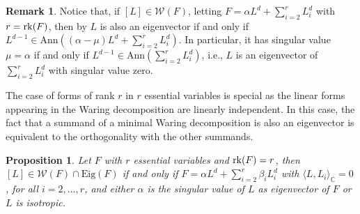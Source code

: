 \documentclass{amsart}
\numberwithin{theorem}{section}
\newtheorem{proposition}[theorem]{Proposition}
\theoremstyle{definition}
\newtheorem{remark}[theorem]{Remark}
\newcommand{\W}{\mathcal{W}}
\newcommand{\CC}{\mathbb{C}}
\newcommand{\rk}{\mathop{\rm rk}\nolimits}
\begin{document}
\begin{remark}\label{rmk:singularvalue=coefficient}
 Notice that, if $[L]\in \W(F)$, letting $F=\alpha L^d+\sum_{i=2}^rL_i^d$ with $r = \rk(F)$, then by  $L$ is also an eigenvector if and only if $L^{d-1}\in\mathrm{Ann}((\alpha-\mu)L^d+\sum_{i=2}^rL_i^d)$. In particular, it has singular value $\mu=\alpha$ if and only if $L^{d-1}\in \mathrm{Ann}(\sum_{i=2}^rL_i^d)$, i.e., $L$ is an eigenvector of $\sum_{i=2}^rL_i^d$ with singular value zero. 

\end{remark}



The case of forms of rank $r$ in $r$ essential variables is special as the linear forms appearing in the Waring decomposition are linearly independent. In this case, the fact that a summand of a minimal Waring decomposition is also an eigenvector is equivalent to the orthogonality with the other summands.

\begin{proposition}\label{prop:essential_var}
    Let $F$ with $r$ essential variables and $\rk(F)=r$, then $[L] \in \mathcal W(F)\cap \mathrm{Eig}(F)$ if and only if $F = \alpha L^d + \sum_{i=2}^r \beta_iL_i^d$ with $\langle L,L_i\rangle_\CC=0$, for all $i = 2,\ldots,r$, and either $\alpha$ is the singular value of $L$ as eigenvector of $F$ or $L$ is isotropic.
\end{proposition}
\end{document}
